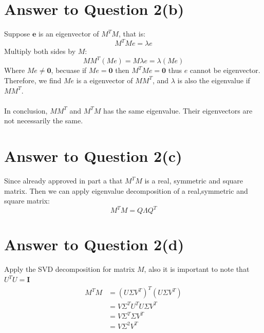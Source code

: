 \documentclass[11pt]{article}
\begin{document}
\section*{Answer to Question 2(b)}
Suppose $\mathbf{e}$ is an eigenvector of $M^TM$, that is:
\begin{equation*}
    M^TMe = \lambda e
\end{equation*}
Multiply both sides by $M$:
\begin{equation*}
    MM^T(Me) = M\lambda e = \lambda (Me)
\end{equation*}
Where $Me \neq \mathbf{0}$, becuase if $Me = \mathbf{0}$ then $M^TMe = \mathbf{0}$ thus $e$ cannot be eigenvector.
Therefore, we find $Me$ is a eigenvector of $MM^T$, and $\lambda$ is also the eigenvalue if $MM^T$.\\
\\
In conclusion, $MM^T$ and $M^TM$ has the same eigenvalue. Their eigenvectors are not necessarily the same.

\pagebreak[4]
\section*{Answer to Question 2(c)}
Since already approved in part a that $M^TM$ is a real, symmetric and square matrix.
Then we can apply eigenvalue decomposition of a real,symmetric and square matrix:
\begin{equation}
    M^TM = Q\Lambda Q^T
\end{equation}

\pagebreak[4]
\section*{Answer to Question 2(d)}
Apply the SVD decomposition for matrix $M$, also it is important to note that $U^TU = \mathbf{I}$
\begin{equation}
\begin{aligned}
    M^TM & = (U\Sigma V^T)^T(U\Sigma V^T)\\
    & = V\Sigma^TU^TU\Sigma V^T\\
    & = V\Sigma^T\Sigma V^T\\
    & = V\Sigma^2 V^T
\end{aligned}
\end{equation}

\pagebreak[4]
\end{document}
